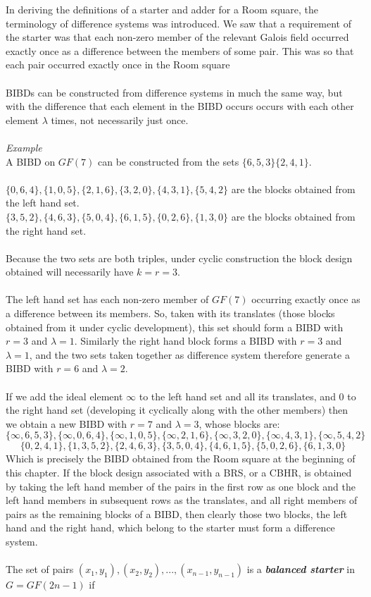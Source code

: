 \documentclass[
  12pt,
  a4paper]{book}
\begin{document}
In deriving the definitions of a starter and adder for a Room square,
the terminology of difference systems was introduced. We saw that a
requirement of the starter was that each non-zero member of the relevant
Galois field occurred exactly once as a difference between the members
of some pair. This was so that each pair occurred exactly once in the
Room square\\
~\\
BIBDs can be constructed from difference systems in much the same way,
but with the difference that each element in the BIBD occurs occurs with
each other element \(\lambda\) times, not necessarily just once.\\
~\\
\emph{Example}\\
A BIBD on \(GF(7)\) can be constructed from the sets
\(\{6,5,3\}\{2,4,1\}\).\\
~\\
\(\{0,6,4\},\{1,0,5\},\{2,1,6\},\{3,2,0\},\{4,3,1\},\{5,4,2\}\) are the
blocks obtained from the left hand set.\\
\(\{3,5,2\},\{4,6,3\},\{5,0,4\},\{6,1,5\},\{0,2,6\},\{1,3,0\}\) are the
blocks obtained from the right hand set.\\
~\\
Because the two sets are both triples, under cyclic construction the
block design obtained will necessarily have \(k=r=3\).\\
~\\
The left hand set has each non-zero member of \(GF(7)\) occurring
exactly once as a difference between its members. So, taken with its
translates (those blocks obtained from it under cyclic development),
this set should form a BIBD with \(r=3\) and \(\lambda=1\). Similarly
the right hand block forms a BIBD with \(r=3\) and \(\lambda=1\), and
the two sets taken together as difference system therefore generate a
BIBD with \(r=6\) and \(\lambda =2\).\\
~\\
If we add the ideal element \(\infty\) to the left hand set and all its
translates, and 0 to the right hand set (developing it cyclically along
with the other members) then we obtain a new BIBD with \(r=7\) and
\(\lambda = 3\), whose blocks are:
\[\{\infty,6,5,3\},\{\infty,0,6,4\},\{\infty,1,0,5\},\{\infty,2,1,6\},\{\infty,3,2,0\},\{\infty,4,3,1\},\{\infty,5,4,2\}\]
\[\{0,2,4,1\},\{1,3,5,2\},\{2,4,6,3\},\{3,5,0,4\},\{4,6,1,5\},\{5,0,2,6\},\{6,1,3,0\}\]
Which is precisely the BIBD obtained from the Room square at the
beginning of this chapter. If the block design associated with a BRS, or
a CBHR, is obtained by taking the left hand member of the pairs in the
first row as one block and the left hand members in subsequent rows as
the translates, and all right members of pairs as the remaining blocks
of a BIBD, then clearly those two blocks, the left hand and the right
hand, which belong to the starter must form a difference system.\\
~\\
The set of pairs \((x_1,y_1),(x_2,y_2),...,(x_{n-1},y_{n-1})\) is a
\textbf{\emph{balanced starter}} in \(G=GF(2n-1)\) if
\end{document}
